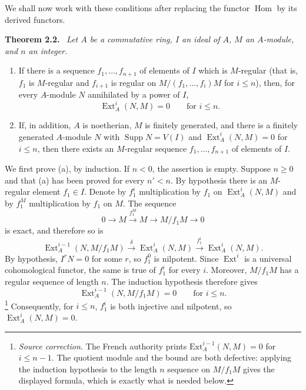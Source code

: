 \documentclass[11pt,a4paper,oneside]{book}
\providecommand{\srcpage}[1]{%
  \marginpar{\raggedright\scriptsize\color{gray}Original French p.~#1}}
\providecommand{\Supp}{\operatorname{Supp}}
\providecommand{\Homop}{\operatorname{Hom}}
\providecommand{\Extop}{\operatorname{Ext}}
\newenvironment{sgastatement}[1]
  {\par\addvspace{0.8\baselineskip}\noindent\textbf{#1.}\ \itshape}
  {\par\addvspace{0.35\baselineskip}}
\theoremstyle{plain}
\theoremstyle{definition}
\theoremstyle{remark}
\begin{document}
We shall now work with these conditions after replacing the
functor $\Homop$ by its derived functors.

\begin{sgastatement}{Theorem 2.2}\srcpage{30}
Let $A$ be a commutative ring, $I$ an ideal of $A$, $M$ an $A$-module, and
$n$ an integer.
\begin{enumerate}[label=\textup{(\alph*)},leftmargin=2.5em]
\item If there is a sequence $f_1,\ldots,f_{n+1}$ of elements of $I$ which
is $M$-regular (that is, $f_1$ is $M$-regular and $f_{i+1}$ is regular on
$M/(f_1,\ldots,f_i)M$ for $i\le n$), then, for every $A$-module $N$
annihilated by a power of $I$,
\[
  \Extop_A^i(N,M)=0\qquad\text{for }i\le n.
\]
\item If, in addition, $A$ is noetherian, $M$ is finitely generated, and
there is a finitely generated $A$-module $N$ with $\Supp N=V(I)$ and
$\Extop_A^i(N,M)=0$ for $i\le n$, then there exists an $M$-regular
sequence $f_1,\ldots,f_{n+1}$ of elements of $I$.
\end{enumerate}
\end{sgastatement}

We first prove (a), by induction. If $n<0$, the assertion is empty. Suppose
$n\ge0$ and that (a) has been proved for every $n'<n$. By hypothesis there
is an $M$-regular element $f_1\in I$. Denote by $f_1^i$ multiplication by
$f_1$ on $\Extop_A^i(N,M)$ and by $f_1^M$ multiplication by $f_1$ on $M$.
The sequence
\begin{equation}\label{eq:III.2.1}
  0\longrightarrow M\xrightarrow{f_1^M}M\longrightarrow M/f_1M
  \longrightarrow0
\end{equation}
is exact, and therefore so is
\[
  \Extop_A^{i-1}(N,M/f_1M)\xrightarrow{\delta}\Extop_A^i(N,M)
  \xrightarrow{f_1^i}\Extop_A^i(N,M).
\]
By hypothesis, $I^rN=0$ for some $r$, so $f_1^0$ is nilpotent. Since
$\Extop^i$ is a universal cohomological functor, the same is true of
$f_1^i$ for every $i$. Moreover, $M/f_1M$ has a regular sequence of length
$n$. The induction hypothesis therefore gives
\[
  \Extop_A^{i-1}(N,M/f_1M)=0\qquad\text{for }i\le n.
\]
\footnote{\textit{Source correction.} The French authority prints
$\mathrm{Ext}_A^{i-1}(N,M)=0$ for $i\le n-1$. The quotient module and the
bound are both defective: applying the induction hypothesis to the length
$n$ sequence on $M/f_1M$ gives the displayed formula, which is exactly what
is needed below.}
Consequently, for $i\le n$, $f_1^i$ is both injective and nilpotent, so
$\Extop_A^i(N,M)=0$.
\end{document}
